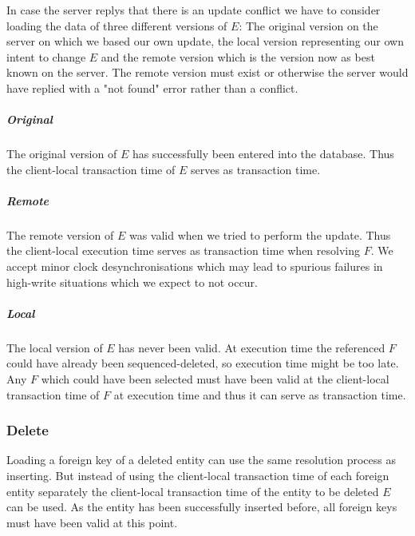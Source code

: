 \documentclass{memoir}
\begin{document}
In case the server replys that there is an update conflict we have to consider loading the data of three different versions of $E$: The original version on the server on which we based our own update, the local version representing our own intent to change $E$ and the remote version which is the version now as best known on the server. The remote version must exist or otherwise the server would have replied with a "not found" error rather than a conflict.

\paragraph{Original} The original version of $E$ has successfully been entered into the database. Thus the client-local transaction time of $E$ serves as transaction time.

\paragraph{Remote} The remote version of $E$ was valid when we tried to perform the update. Thus the client-local execution time serves as transaction time when resolving $F$. We accept minor clock desynchronisations which may lead to spurious failures in high-write situations which we expect to not occur.

\paragraph{Local} The local version of $E$ has never been valid. At execution time the referenced $F$ could have already been sequenced-deleted, so execution time might be too late. Any $F$ which could have been selected must have been valid at the client-local transaction time of $F$ at execution time and thus it can serve as transaction time.

\subsection{Delete}

Loading a foreign key of a deleted entity can use the same resolution process as inserting. But instead of using the client-local transaction time of each foreign entity separately the client-local transaction time of the entity to be deleted $E$ can be used. As the entity has been successfully inserted before, all foreign keys must have been valid at this point.

\chapter{}
\end{document}
